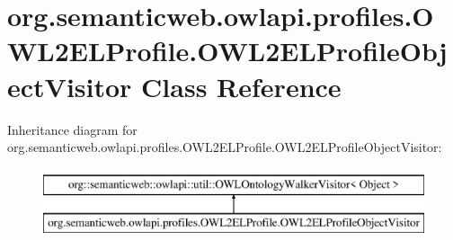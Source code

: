 \hypertarget{classorg_1_1semanticweb_1_1owlapi_1_1profiles_1_1_o_w_l2_e_l_profile_1_1_o_w_l2_e_l_profile_object_visitor}{\section{org.\-semanticweb.\-owlapi.\-profiles.\-O\-W\-L2\-E\-L\-Profile.\-O\-W\-L2\-E\-L\-Profile\-Object\-Visitor Class Reference}
\label{classorg_1_1semanticweb_1_1owlapi_1_1profiles_1_1_o_w_l2_e_l_profile_1_1_o_w_l2_e_l_profile_object_visitor}
}
Inheritance diagram for org.\-semanticweb.\-owlapi.\-profiles.\-O\-W\-L2\-E\-L\-Profile.\-O\-W\-L2\-E\-L\-Profile\-Object\-Visitor\-:\begin{figure}[H]
\begin{center}
\leavevmode
\includegraphics[height=2.000000cm]{classorg_1_1semanticweb_1_1owlapi_1_1profiles_1_1_o_w_l2_e_l_profile_1_1_o_w_l2_e_l_profile_object_visitor}
\end{center}
\end{figure}
